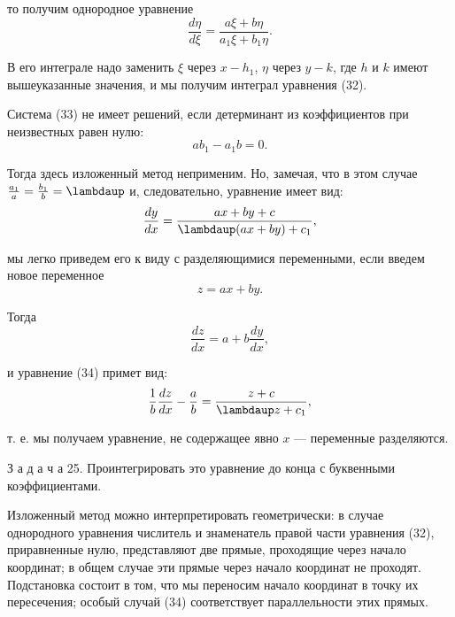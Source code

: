\documentclass{book}
\begin{document}
\rhead{\footnotesize [гл. i}

\setcounter{equation}{33}

\noindent
то получим однородное уравнение
%
\begin{equation*}
\frac{d\eta}{d\xi} = \frac{a\xi + b\eta}{a_1\xi + b_1\eta} .
\end{equation*}

\noindent
В его интеграле надо заменить $\xi$ через $x - h_1$, $\eta$ через $y - k$, где $h$ и $k$ имеют вышеуказанные значения, и мы получим интеграл уравнения (32).

Система (33) не имеет решений, если детерминант из коэффициентов при неизвестных равен нулю:
%
\begin{equation*}
ab_1 - a_1b = 0 .
\end{equation*}

\noindent
Тогда здесь изложенный метод неприменим. Но, замечая, что в этом случае $\frac{a_1}{a}=\frac{b_1}{b}=\lambdaup$ и, следовательно, уравнение имеет вид:
%
\begin{equation}
\frac{dy}{dx}=\frac{ax + by + c}{\lambdaup (ax + by) + c_1} ,
\end{equation}

\noindent
мы легко приведем его к виду с разделяющимися переменными, если введем новое переменное
%
\begin{equation*}
z = ax + by .
\end{equation*}

\noindent
Тогда
%
\begin{equation*}
\frac{dz}{dx} = a + b\frac{dy}{dx} ,
\end{equation*}

\noindent
и уравнение (34) примет вид:
%
\begin{equation*}
\frac{1}{b}\frac{dz}{dx} - \frac{a}{b} = \frac{z + c}{\lambdaup z + c_1} ,
\end{equation*}

т. е. мы получаем уравнение, не содержащее явно $x$ --- переменные разделяются.

\indent
З а д а ч а 25. Проинтегрировать это уравнение до конца с буквенными коэффициентами.

\indent
Изложенный метод можно интерпретировать геометрически: в случае однородного уравнения числитель и знаменатель правой части уравнения (32), приравненные нулю, представляют две прямые, проходящие через начало координат; в общем случае эти прямые через начало координат не проходят. Подстановка состоит в том, что мы переносим начало координат в точку их пересечения; особый случай (34) соответствует параллельности этих прямых.
\end{document}
